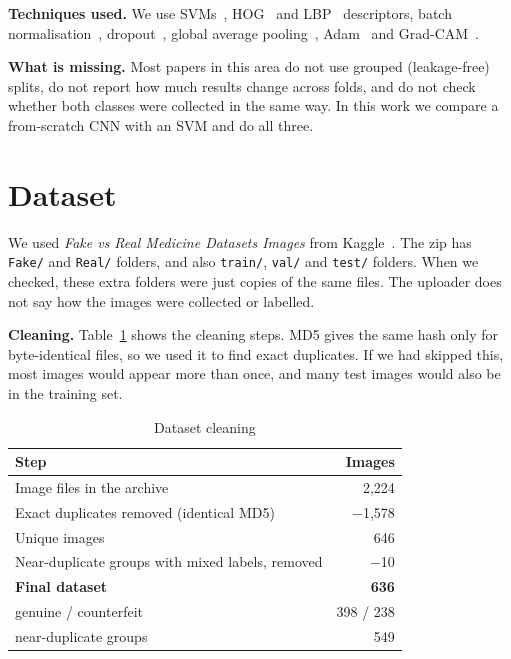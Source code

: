 \documentclass[conference]{IEEEtran}
\begin{document}
\textbf{Techniques used.} We use SVMs~\cite{cortes1995}, HOG~\cite{dalal2005} and LBP~\cite{ojala2002} descriptors, batch normalisation~\cite{ioffe2015}, dropout~\cite{srivastava2014}, global average pooling~\cite{lin2014}, Adam~\cite{kingma2015} and Grad-CAM~\cite{selvaraju2017}.

\textbf{What is missing.} Most papers in this area do not use grouped (leakage-free) splits, do not report how much results change across folds, and do not check whether both classes were collected in the same way. In this work we compare a from-scratch CNN with an SVM and do all three.

\section{Dataset}
We used \emph{Fake vs Real Medicine Datasets Images} from Kaggle~\cite{kaggle}. The zip has \texttt{Fake/} and \texttt{Real/} folders, and also \texttt{train/}, \texttt{val/} and \texttt{test/} folders. When we checked, these extra folders were just copies of the same files. The uploader does not say how the images were collected or labelled.

\textbf{Cleaning.} Table~\ref{tab:cleaning} shows the cleaning steps. MD5 gives the same hash only for byte-identical files, so we used it to find exact duplicates. If we had skipped this, most images would appear more than once, and many test images would also be in the training set.

\begin{table}[t]
\caption{Dataset cleaning}
\label{tab:cleaning}
\centering
\begin{tabular}{lr}
\toprule
Step & Images \\
\midrule
Image files in the archive & 2{,}224 \\
Exact duplicates removed (identical MD5) & $-$1{,}578 \\
Unique images & 646 \\
Near-duplicate groups with mixed labels, removed & $-$10 \\
\midrule
\textbf{Final dataset} & \textbf{636} \\
\quad genuine / counterfeit & 398 / 238 \\
\quad near-duplicate groups & 549 \\
\bottomrule
\end{tabular}
\end{table}
\end{document}
